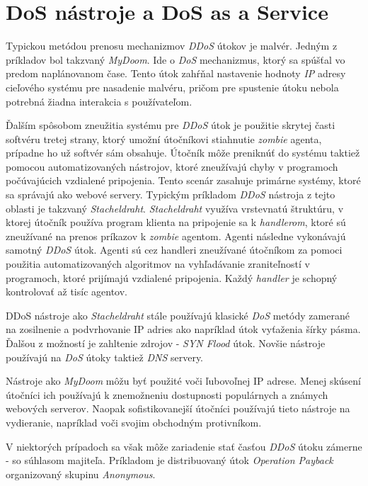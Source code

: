 \documentclass[
  printed, %
  table,   %
  lof,     %
  lot,     %
]{fithesis3}
\begin{document}
\section{DoS nástroje a DoS as a Service}
Typickou metódou prenosu mechanizmov \textit{DDoS} útokov je malvér. Jedným z príkladov bol
takzvaný \textit{MyDoom}. Ide o \textit{DoS} mechanizmus, ktorý sa spúšťal vo predom naplánovanom čase.
Tento útok zahŕňal nastavenie hodnoty \textit{IP} adresy cieľového systému pre nasadenie malvéru,
pričom pre spustenie útoku nebola potrebná žiadna interakcia s používateľom.

Ďalším spôsobom zneužitia systému pre \textit{DDoS} útok je použitie skrytej časti softvéru tretej
strany, ktorý umožní útočníkovi stiahnutie \textit{zombie} agenta, prípadne ho už softvér sám obsahuje.
Útočník môže preniknúť do systému taktiež pomocou automatizovaných nástrojov, ktoré zneužívajú chyby v
programoch počúvajúcich vzdialené pripojenia. Tento scenár zasahuje primárne systémy, ktoré sa správajú
ako webové servery. Typickým príkladom \textit{DDoS} nástroja z tejto oblasti je takzvaný
\textit{Stacheldraht}. \textit{Stacheldraht} využíva vrstevnatú štruktúru, v ktorej útočník používa
program klienta na pripojenie sa k \textit{handlerom}, ktoré sú zneužívané na prenos príkazov
k \textit{zombie} agentom. Agenti následne vykonávajú samotný \textit{DDoS} útok. Agenti sú cez handleri
zneužívané útočníkom za pomoci použitia automatizovaných algoritmov na vyhľadávanie zraniteľností v
programoch, ktoré prijímajú vzdialené pripojenia. Každý \textit{handler} je schopný kontrolovať až tisíc
agentov. 

DDoS nástroje ako \textit{Stacheldraht} stále používajú klasické \textit{DoS} metódy zamerané na
zosilnenie a podvrhovanie IP adries ako napríklad útok vyťaženia šírky pásma. Ďalšou z možností je
zahltenie zdrojov - \textit{SYN Flood} útok. Novšie nástroje používajú na \textit{DoS} útoky taktiež
\textit{DNS} servery.

Nástroje ako \textit{MyDoom} môžu byť použité voči ľubovoľnej IP adrese. Menej skúsení útočníci ich
používajú k znemožneniu dostupnosti populárnych a známych webových serverov. Naopak sofistikovanejší
útočníci používajú tieto nástroje na vydieranie, napríklad voči svojim obchodným protivníkom.

V niektorých prípadoch sa však môže zariadenie stať časťou \textit{DDoS} útoku zámerne - so súhlasom
majiteľa. Príkladom je distribuovaný útok \textit{Operation Payback} organizovaný skupinu
\textit{Anonymous}.
\end{document}
